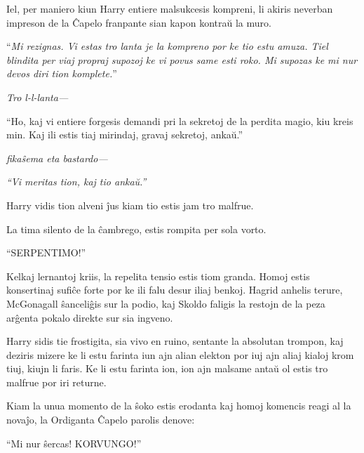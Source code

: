 Iel, per maniero kiun Harry entiere malsukcesis kompreni, li akiris
neverban impreson de la Ĉapelo franpante sian kapon kontraŭ la muro.

``\emph{Mi rezignas. Vi estas tro lanta je la kompreno por ke tio estu
  amuza. Tiel blindita per viaj propraj supozoj ke vi povus same esti
  roko. Mi supozas ke mi nur devos diri tion komplete.}''

\emph{Tro l-l-lanta—}

``Ho, kaj vi entiere forgesis demandi pri la sekretoj de la perdita
magio, kiu kreis min. Kaj ili estis tiaj mirindaj, gravaj sekretoj,
ankaŭ.''

\emph{fikaŝema eta bastardo—}

\emph{``Vi meritas tion, kaj tio ankaŭ.''}

Harry vidis tion alveni ĵus kiam tio estis jam tro malfrue.

La tima silento de la ĉambrego, estis rompita per sola vorto.

``SERPENTIMO!''

Kelkaj lernantoj kriis, la repelita tensio estis tiom granda. Homoj
estis konsertinaj sufiĉe forte por ke ili falu desur iliaj
benkoj. Hagrid anhelis terure, McGonagall ŝanceliĝis sur la podio, kaj
Skoldo faligis la restojn de la peza arĝenta pokalo direkte sur sia
ingveno.

Harry sidis tie frostigita, sia vivo en ruino, sentante la absolutan
trompon, kaj deziris mizere ke li estu farinta iun ajn alian elekton
por iuj ajn aliaj kialoj krom tiuj, kiujn li faris. Ke li estu farinta
ion, ion ajn malsame antaŭ ol estis tro malfrue por iri returne.

Kiam la unua momento de la ŝoko estis erodanta kaj homoj komencis
reagi al la novaĵo, la Ordiganta Ĉapelo parolis denove:

``Mi nur ŝercas! KORVUNGO!''











  












